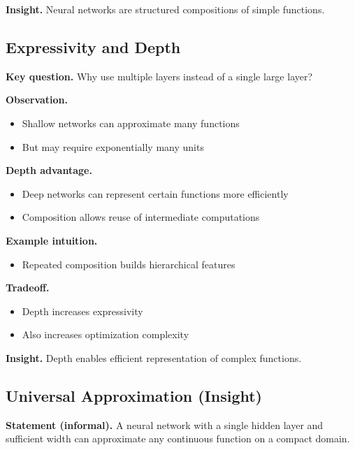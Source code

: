 \medskip

\noindent
\textbf{Insight.}  
Neural networks are structured compositions of simple functions.

\subsection{Expressivity and Depth}

\textbf{Key question.}  
Why use multiple layers instead of a single large layer?

\medskip

\noindent
\textbf{Observation.}
\begin{itemize}
    \item Shallow networks can approximate many functions
    \item But may require exponentially many units
\end{itemize}

\medskip

\noindent
\textbf{Depth advantage.}
\begin{itemize}
    \item Deep networks can represent certain functions more efficiently
    \item Composition allows reuse of intermediate computations
\end{itemize}

\medskip

\noindent
\textbf{Example intuition.}
\begin{itemize}
    \item Repeated composition builds hierarchical features
\end{itemize}

\medskip

\noindent
\textbf{Tradeoff.}
\begin{itemize}
    \item Depth increases expressivity
    \item Also increases optimization complexity
\end{itemize}

\medskip

\noindent
\textbf{Insight.}  
Depth enables efficient representation of complex functions.

\subsection{Universal Approximation (Insight)}

\textbf{Statement (informal).}  
A neural network with a single hidden layer and sufficient width can approximate any continuous function on a compact domain.

